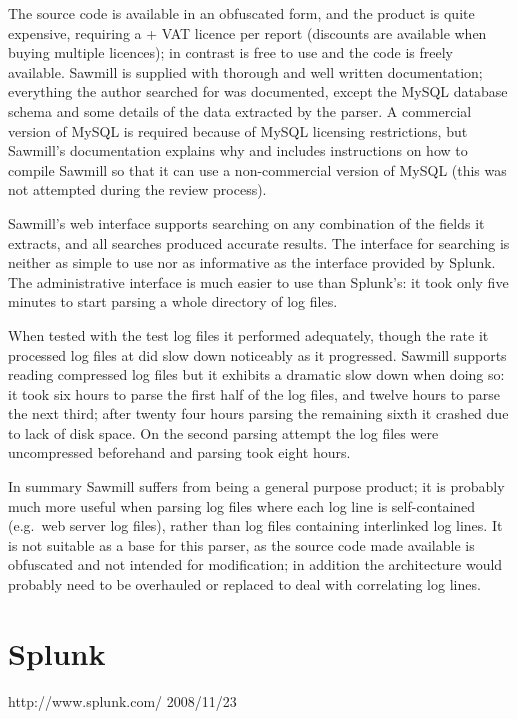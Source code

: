 The source code is available in an obfuscated form, and the product is
quite expensive, requiring a  + VAT licence per report
(discounts are available when buying multiple licences); in contrast
\parsername{} is free to use and the code is freely available.  Sawmill is
supplied with thorough and well written documentation; everything the
author searched for was documented, except the MySQL database schema and
some details of the data extracted by the parser.  A commercial version of
MySQL is required because of MySQL licensing restrictions, but Sawmill's
documentation explains why and includes instructions on how to compile
Sawmill so that it can use a non-commercial version of MySQL (this was not
attempted during the review process).

Sawmill's web interface supports searching on any combination of the fields
it extracts, and all searches produced accurate results.  The interface for
searching is neither as simple to use nor as informative as the interface
provided by Splunk.  The administrative interface is much easier to use
than Splunk's: it took only five minutes to start parsing a whole directory
of log files.

When tested with the \numberOFlogFILES{} test log files it performed
adequately, though the rate it processed log files at did slow down
noticeably as it progressed.  Sawmill supports reading compressed log files
but it exhibits a dramatic slow down when doing so: it took six hours to
parse the first half of the log files, and twelve hours to parse the next
third; after twenty four hours parsing the remaining sixth it crashed due
to lack of disk space.  On the second parsing attempt the log files were
uncompressed beforehand and parsing took eight hours.

In summary Sawmill suffers from being a general purpose product; it is
probably much more useful when parsing log files where each log line is
self-contained (e.g.\ web server log files), rather than log files
containing interlinked log lines.  It is not suitable as a base for this
parser, as the source code made available is obfuscated and not intended
for modification; in addition the architecture would probably need to be
overhauled or replaced to deal with correlating log lines.

\section{Splunk}

{http://www.splunk.com/}
{2008/11/23}

